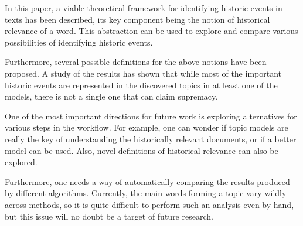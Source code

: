 
In this paper, a viable theoretical framework for identifying historic events in texts has been described, its key component being the notion of historical relevance of a word. This abstraction can be used to explore and compare various possibilities of identifying historic events.

Furthermore, several possible definitions for the above notions have been proposed. A study of the results has shown that while most of the important historic events are represented in the discovered topics in at least one of the models, there is not a single one that can claim supremacy.

One of the most important directions for future work is exploring alternatives for various steps in the workflow. For example, one can wonder if topic models are really the key of understanding the historically relevant documents, or if a better model can be used. Also, novel definitions of historical relevance can also be explored.

Furthermore, one needs a way of automatically comparing the results produced by different algorithms. Currently, the main words forming a topic vary wildly across methods, so it is quite difficult to perform such an analysis even by hand, but this issue will no doubt be a target of future research.
